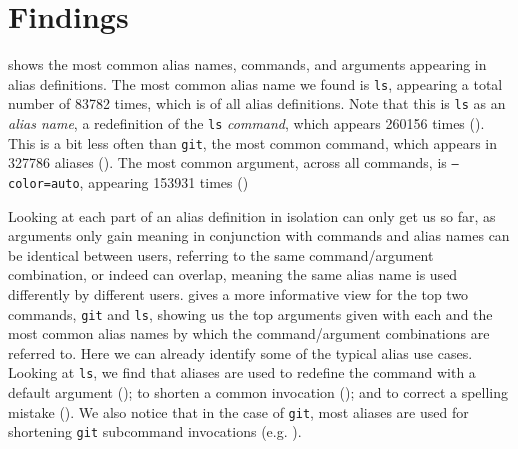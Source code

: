 \section{Findings}



 shows the most common alias names, commands, and arguments appearing in alias definitions.
The most common alias name we found is \texttt{ls}, appearing a total number of \num{83782} times, which is  of all alias definitions.
Note that this is \texttt{ls} as an \emph{alias name}, a redefinition of the \texttt{ls} \emph{command}, which appears \num{260156} times ().
This is a bit less often than \texttt{git}, the most common command, which appears in \num{327786} aliases ().
The most common argument, across all commands, is \texttt{--color=auto}, appearing \num{153931} times ()



Looking at each part of an alias definition in isolation can only get us so far, as arguments only gain meaning in conjunction with commands and alias names can be identical between users, referring to the same command/argument combination, or indeed can overlap, meaning the same alias name is used differently by different users.
 gives a more informative view for the top two commands, \texttt{git} and \texttt{ls}, showing us the top arguments given with each and the most common alias names by which the command/argument combinations are referred to.
Here we can already identify some of the typical alias use cases.
Looking at \texttt{ls}, we find that aliases are used
to redefine the command with a default argument ();
to shorten a common invocation ();
and to correct a spelling mistake ().
We also notice that in the case of \texttt{git}, most aliases are used for shortening \texttt{git} subcommand invocations (e.g. ).

